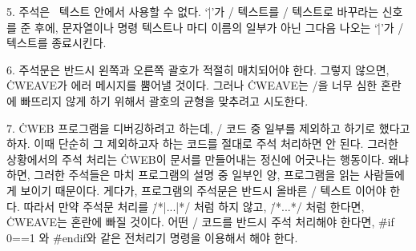 5. 주석은 \pb\ 텍스트 안에서 사용할 수 없다. `\.|'가 \TEX/ 텍스트를 \CEE/ 텍스트로
바꾸라는 신호를 준 후에, 문자열이나 명령 텍스트나 마디 이름의 일부가 아닌 그다음 나오는
`\.|'가 \CEE/ 텍스트를 종료시킨다.

6. 주석문은 반드시 왼쪽과 오른쪽 괄호가 적절히 매치되어야 한다. 그렇지 않으면, \.{CWEAVE}가
에러 메시지를 뿜어낼 것이다. 그러나 \.{CWEAVE}는 \TEX/을 너무 심한 혼란에 빠뜨리지 않게
하기 위해서 괄호의 균형을 맞추려고 시도한다.

7. \.{CWEB} 프로그램을 디버깅하려고 하는데, \CEE/ 코드 중 일부를 제외하고 하기로 했다고
하자. 이때 단순히 그 제외하고자 하는 코드를 절대로 주석 처리하면 안 된다. 그러한 상황에서의
주석 처리는 \.{CWEB}이 문서를 만들어내는 정신에 어긋나는 행동이다. 왜냐하면, 그러한 주석들은
마치 프로그램의 설명 중 일부인 양, 프로그램을 읽는 사람들에게 보이기 때문이다. 게다가,
프로그램의 주석문은 반드시 올바른 \TEX/ 텍스트 이어야 한다. 따라서 만약 주석문 처리를
\.{/*|...|*/} 처럼 하지 않고, \.{/*...*/} 처럼 한다면, \.{CWEAVE}는 혼란에 빠질
것이다. 어떤 \CEE/ 코드를 반드시 주석 처리해야 한다면, \.{\#if 0==1} 와 \.{\#endif}와
같은 전처리기 명령을 이용해서 해야 한다.

